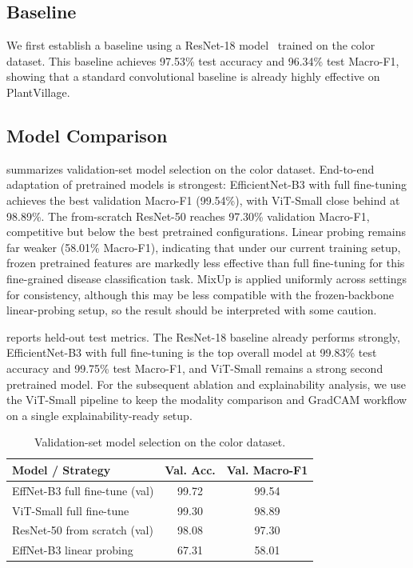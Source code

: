 \documentclass[10pt,twocolumn,letterpaper]{article}
\begin{document}
\subsection{Baseline}

We first establish a baseline using a ResNet-18 model~\cite{he2016resnet} trained on the color dataset. This baseline achieves 97.53\% test accuracy and 96.34\% test Macro-F1, showing that a standard convolutional baseline is already highly effective on PlantVillage.

\subsection{Model Comparison}

 summarizes validation-set model selection on the color dataset. End-to-end adaptation of pretrained models is strongest: EfficientNet-B3 with full fine-tuning achieves the best validation Macro-F1 (99.54\%), with ViT-Small close behind at 98.89\%. The from-scratch ResNet-50 reaches 97.30\% validation Macro-F1, competitive but below the best pretrained configurations. Linear probing remains far weaker (58.01\% Macro-F1), indicating that under our current training setup, frozen pretrained features are markedly less effective than full fine-tuning for this fine-grained disease classification task. MixUp is applied uniformly across settings for consistency, although this may be less compatible with the frozen-backbone linear-probing setup, so the result should be interpreted with some caution.

 reports held-out test metrics. The ResNet-18 baseline already performs strongly, EfficientNet-B3 with full fine-tuning is the top overall model at 99.83\% test accuracy and 99.75\% test Macro-F1, and ViT-Small remains a strong second pretrained model. For the subsequent ablation and explainability analysis, we use the ViT-Small pipeline to keep the modality comparison and GradCAM workflow on a single explainability-ready setup.

\begin{table}[t]
\centering
\small
\begin{tabular}{lcc}
\toprule
Model / Strategy & Val. Acc. & Val. Macro-F1 \\
\midrule
EffNet-B3 full fine-tune (val) & 99.72 & 99.54 \\
ViT-Small full fine-tune & 99.30 & 98.89 \\
ResNet-50 from scratch (val) & 98.08 & 97.30 \\
EffNet-B3 linear probing & 67.31 & 58.01 \\
\bottomrule
\end{tabular}
\caption{Validation-set model selection on the color dataset.}
\label{tab:model-selection}
\end{table}
\end{document}
